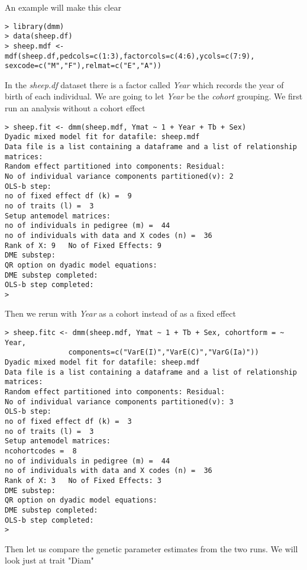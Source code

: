 \documentclass[titlepage]{article}  %
\begin{document}
An example will make this clear
\begin{verbatim}
> library(dmm)
> data(sheep.df)
> sheep.mdf <- mdf(sheep.df,pedcols=c(1:3),factorcols=c(4:6),ycols=c(7:9),                              sexcode=c("M","F"),relmat=c("E","A"))
\end{verbatim}
 
In the {\em sheep.df} dataset there is a factor called {\em Year} which records the year of birth of each individual. We are going to let {\em Year} be the {\em cohort} grouping. We first run an analysis without a cohort effect

\begin{verbatim}
> sheep.fit <- dmm(sheep.mdf, Ymat ~ 1 + Year + Tb + Sex)
Dyadic mixed model fit for datafile: sheep.mdf  
Data file is a list containing a dataframe and a list of relationship matrices:
Random effect partitioned into components: Residual:
No of individual variance components partitioned(v): 2 
OLS-b step:
no of fixed effect df (k) =  9 
no of traits (l) =  3 
Setup antemodel matrices:
no of individuals in pedigree (m) =  44 
no of individuals with data and X codes (n) =  36 
Rank of X: 9   No of Fixed Effects: 9 
DME substep:
QR option on dyadic model equations:
DME substep completed:
OLS-b step completed:
> 
\end{verbatim}
 
Then we rerun with {\em Year} as a cohort instead of as a fixed effect

\begin{verbatim}
> sheep.fitc <- dmm(sheep.mdf, Ymat ~ 1 + Tb + Sex, cohortform = ~ Year,
               components=c("VarE(I)","VarE(C)","VarG(Ia)"))
Dyadic mixed model fit for datafile: sheep.mdf  
Data file is a list containing a dataframe and a list of relationship matrices:
Random effect partitioned into components: Residual:
No of individual variance components partitioned(v): 3 
OLS-b step:
no of fixed effect df (k) =  3 
no of traits (l) =  3 
Setup antemodel matrices:
ncohortcodes =  8 
no of individuals in pedigree (m) =  44 
no of individuals with data and X codes (n) =  36 
Rank of X: 3   No of Fixed Effects: 3 
DME substep:
QR option on dyadic model equations:
DME substep completed:
OLS-b step completed:
> 
\end{verbatim}

Then let us compare the genetic parameter estimates from the two runs. We will look just at trait "Diam"
\end{document}
